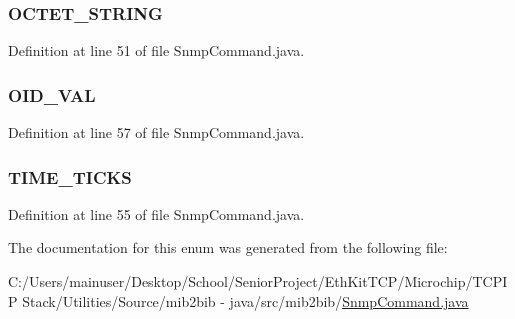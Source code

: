 \subsubsection[{O\+C\+T\+E\+T\+\_\+\+S\+T\+R\+I\+N\+G}]{\setlength{\rightskip}{0pt plus 5cm}O\+C\+T\+E\+T\+\_\+\+S\+T\+R\+I\+N\+G}\label{enummib2bib_1_1_snmp_command_1_1_d_a_t_a___t_y_p_e_a8fbd772a1cb7bca709fc66b8dba63884}


Definition at line 51 of file Snmp\+Command.\+java.

\hypertarget{enummib2bib_1_1_snmp_command_1_1_d_a_t_a___t_y_p_e_ada6c6a6988a58987691874ebf2f9daa7}{}
\subsubsection[{O\+I\+D\+\_\+\+V\+A\+L}]{\setlength{\rightskip}{0pt plus 5cm}O\+I\+D\+\_\+\+V\+A\+L}\label{enummib2bib_1_1_snmp_command_1_1_d_a_t_a___t_y_p_e_ada6c6a6988a58987691874ebf2f9daa7}


Definition at line 57 of file Snmp\+Command.\+java.

\hypertarget{enummib2bib_1_1_snmp_command_1_1_d_a_t_a___t_y_p_e_a6f02077b55b986d19b9a032458258590}{}
\subsubsection[{T\+I\+M\+E\+\_\+\+T\+I\+C\+K\+S}]{\setlength{\rightskip}{0pt plus 5cm}T\+I\+M\+E\+\_\+\+T\+I\+C\+K\+S}\label{enummib2bib_1_1_snmp_command_1_1_d_a_t_a___t_y_p_e_a6f02077b55b986d19b9a032458258590}


Definition at line 55 of file Snmp\+Command.\+java.



The documentation for this enum was generated from the following file\+:\begin{DoxyCompactItemize}
\item 
C\+:/\+Users/mainuser/\+Desktop/\+School/\+Senior\+Project/\+Eth\+Kit\+T\+C\+P/\+Microchip/\+T\+C\+P\+I\+P Stack/\+Utilities/\+Source/mib2bib -\/ java/src/mib2bib/\hyperlink{_snmp_command_8java}{Snmp\+Command.\+java}\end{DoxyCompactItemize}
